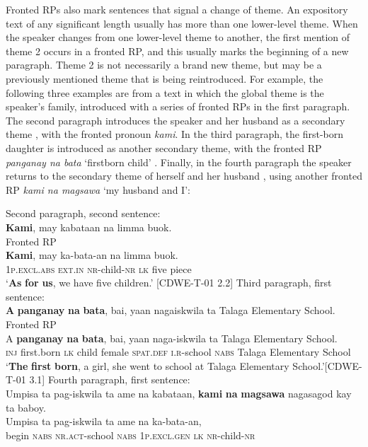 Fronted RPs also mark sentences that signal a change of theme. An expository text of any significant length usually has more than one lower-level theme. When the speaker changes from one lower-level theme to another, the first mention of theme 2 occurs in a fronted RP, and this usually marks the beginning of a new paragraph. Theme 2 is not necessarily a brand new theme, but may be a previously mentioned theme that is being reintroduced. For example, the following three examples are from a text in which the global theme is the speaker’s family, introduced with a series of fronted RPs in the first paragraph. The second paragraph introduces the speaker and her husband as a secondary theme , with the fronted pronoun \textit{kami}. In the third paragraph, the first-born daughter is introduced as another secondary theme, with the fronted RP \textit{panganay na bata} ‘firstborn child’ . Finally, in the fourth paragraph the speaker returns to the secondary theme of herself and her husband , using another fronted RP \textit{kami na magsawa} ‘my husband and I’:

\ea 
\label{bkm:Ref372873939}
Second paragraph, second sentence: \\
\textbf{Kami},  may  kabataan  na  limma  buok. \\\smallskip
Fronted RP \\
\gll \textbf{Kami},  may  ka-bata-an  na  limma  buok. \\
1\textsc{p.excl.abs}  \textsc{ext.in}  \textsc{nr-}child-\textsc{nr}   \textsc{lk}  five  piece \\
\glt ‘\textbf{As} \textbf{for} \textbf{us}, we have five children.’ [CDWE-T-01 2.2]
\z
\ea
\label{bkm:Ref122614214}
Third paragraph, first sentence: \\
\textbf{A}  \textbf{panganay}  \textbf{na}  \textbf{bata},  bai,  yaan  nagaiskwila  ta  Talaga Elementary School. \\\smallskip
\hspace{.5cm}Fronted RP \\
\gll A  \textbf{panganay}  \textbf{na}  \textbf{bata},  bai,  yaan  naga-iskwila\footnotemark{}  ta  Talaga Elementary School. \\
\textsc{inj}  first.born  \textsc{lk}  child  female  \textsc{spat.def}  \textsc{i.r}-school  \textsc{nabs}  Talaga Elementary School \\
\glt `\textbf{The} \textbf{first} \textbf{born}, a girl, she went to school at Talaga Elementary School.’[CDWE-T-01 3.1]
\z
\ea 
\label{bkm:Ref372873998}
Fourth paragraph, first sentence: \\
Umpisa  ta  pag-iskwila  ta  ame  na  kabataan,  \textbf{kami}  \textbf{na}  \textbf{magsawa}  nagasagod  kay  ta  baboy. \\\smallskip
\gll Umpisa  ta  pag-iskwila  ta  ame  na  ka-bata-an, \\
begin \textsc{nabs} \textsc{nr.act}-school \textsc{nabs} 1\textsc{p.excl.gen} \textsc{lk} \textsc{nr}-child-\textsc{nr} \\\smallskip
 {}

